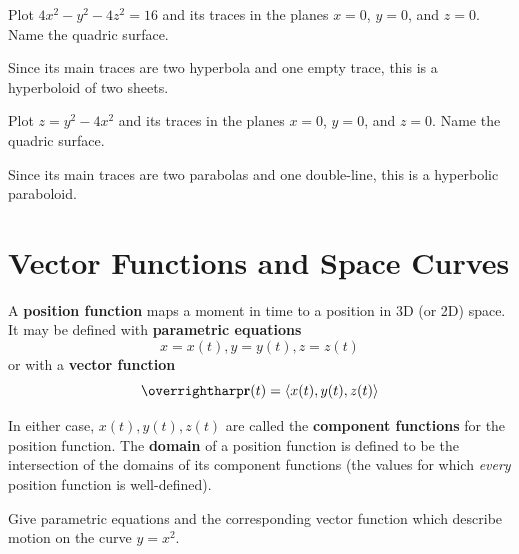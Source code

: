 \documentclass[letterpaper, twoside, 12pt]{book}
\begin{document}
          \begin{problem}
            Plot $4x^2-y^2-4z^2=16$ and its traces in the planes $x=0$, $y=0$,
            and $z=0$.
            Name the quadric surface.
          \end{problem}

          \begin{solution}
  Since its main traces are two hyperbola and one empty trace,
  this is a hyperboloid of two sheets.
          \end{solution}

          \begin{problem}
            Plot $z=y^2-4x^2$ and its traces in the planes $x=0$, $y=0$,
            and $z=0$.
            Name the quadric surface.
          \end{problem}

          \begin{solution}
  Since its main traces are two parabolas and one double-line,
  this is a hyperbolic paraboloid.
          \end{solution}







\setcounter{chapter}{13}
\setcounter{section}{0}

\section{Vector Functions and Space Curves}

\begin{definition}
A \textbf{position function} maps a moment in time to a position in 3D
(or 2D) space.
It may be defined with \textbf{parametric equations}
  \[x=x(t), y=y(t), z=z(t)\]
or with a \textbf{vector function}
\[\vect{r}(t) = \<x(t),y(t),z(t)\>\]

In either case, $x(t),y(t),z(t)$ are called the \textbf{component functions}
for the position function. The \textbf{domain} of a position function is
defined to be the intersection of the domains of its component functions
(the values for which \textit{every} position function is well-defined).
\end{definition}

          \begin{problem}
            Give parametric equations and the corresponding vector function
            which describe motion on the curve $y=x^2$.
          \end{problem}
\end{document}
